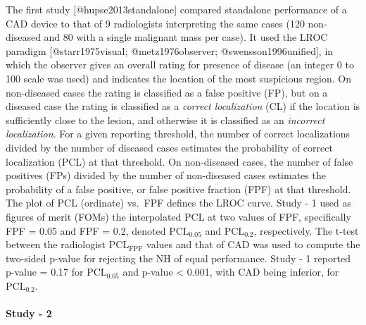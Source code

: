 \documentclass[
]{article}
\begin{document}
The first study {[}@hupse2013standalone{]} compared standalone performance of a CAD device to that of 9 radiologists interpreting the same cases (120 non-diseased and 80 with a single malignant mass per case). It used the LROC paradigm {[}@starr1975visual; @metz1976observer; @swensson1996unified{]}, in which the observer gives an overall rating for presence of disease (an integer 0 to 100 scale was used) and indicates the location of the most suspicious region. On non-diseased cases the rating is classified as a false positive (FP), but on a diseased case the rating is classified as a \emph{correct localization} (CL) if the location is sufficiently close to the lesion, and otherwise it is classified as an \emph{incorrect localization}. For a given reporting threshold, the number of correct localizations divided by the number of diseased cases estimates the probability of correct localization (PCL) at that threshold. On non-diseased cases, the number of false positives (FPs) divided by the number of non-diseased cases estimates the probability of a false positive, or false positive fraction (FPF) at that threshold. The plot of PCL (ordinate) vs.~FPF defines the LROC curve. Study - 1 used as figures of merit (FOMs) the interpolated PCL at two values of FPF, specifically FPF = 0.05 and FPF = 0.2, denoted \(\text{PCL}_{0.05}\) and \(\text{PCL}_{0.2}\), respectively. The t-test between the radiologist \(\text{PCL}_{\text{FPF}}\) values and that of CAD was used to compute the two-sided p-value for rejecting the NH of equal performance. Study - 1 reported p-value = 0.17 for \(\text{PCL}_{0.05}\) and p-value \textless{} 0.001, with CAD being inferior, for \(\text{PCL}_{0.2}\).

\hypertarget{standalone-cad-radiologists-study2}{%
\paragraph{Study - 2}\label{standalone-cad-radiologists-study2}}
\end{document}
